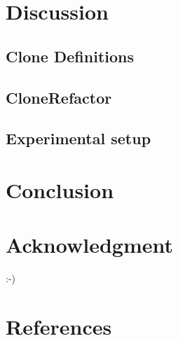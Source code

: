 \documentclass[conference]{IEEEtran}
\begin{document}
\section{Discussion}
\subsection{Clone Definitions}

\subsection{CloneRefactor}

\subsection{Experimental setup}

\section{Conclusion}

\section*{Acknowledgment}
:-)

\section*{References}
\end{document}
